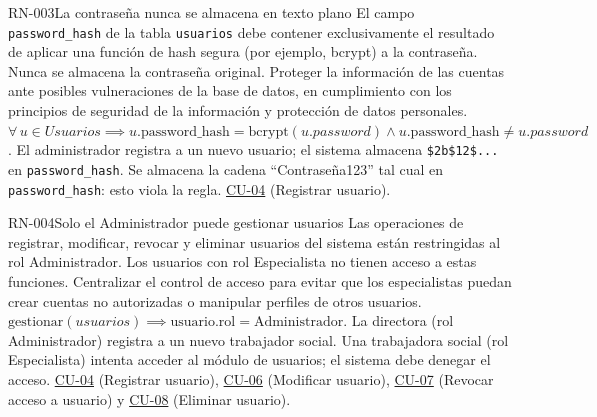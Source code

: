 \begin{BussinesRule}[%
	\brClassification{\btDerivation}{\bcIntegrity}{\blStrict}%
	]{RN-003}{La contraseña nunca se almacena en texto plano}
	\BRitem[Descripción:] El campo \texttt{password\_hash} de la tabla \texttt{usuarios} debe contener exclusivamente el resultado de aplicar una función de hash segura (por ejemplo, bcrypt) a la contraseña. Nunca se almacena la contraseña original.
	\BRitem[Motivación:] Proteger la información de las cuentas ante posibles vulneraciones de la base de datos, en cumplimiento con los principios de seguridad de la información y protección de datos personales.
	\BRitem[Sentencia:] $\forall \, u \in Usuarios \implies u.\text{password\_hash} = \text{bcrypt}(u.password) \land u.\text{password\_hash} \neq u.password$.
	 El administrador registra a un nuevo usuario; el sistema almacena \texttt{\$2b\$12\$...} en \texttt{password\_hash}.
	 Se almacena la cadena ``Contraseña123'' tal cual en \texttt{password\_hash}: esto viola la regla.
	 \hyperlink{CU-04}{CU-04} (Registrar usuario).
\end{BussinesRule}

\begin{BussinesRule}[%
	\brClassification{\btEnabler}{\bcAutorization}{\blStrict}%
	]{RN-004}{Solo el Administrador puede gestionar usuarios}
	\BRitem[Descripción:] Las operaciones de registrar, modificar, revocar y eliminar usuarios del sistema están restringidas al rol Administrador. Los usuarios con rol Especialista no tienen acceso a estas funciones.
	\BRitem[Motivación:] Centralizar el control de acceso para evitar que los especialistas puedan crear cuentas no autorizadas o manipular perfiles de otros usuarios.
	\BRitem[Sentencia:] $\text{gestionar}(usuarios) \implies \text{usuario.rol} = \text{Administrador}$.
	 La directora (rol Administrador) registra a un nuevo trabajador social.
	 Una trabajadora social (rol Especialista) intenta acceder al módulo de usuarios; el sistema debe denegar el acceso.
	 \hyperlink{CU-04}{CU-04} (Registrar usuario), \hyperlink{CU-06}{CU-06} (Modificar usuario), \hyperlink{CU-07}{CU-07} (Revocar acceso a usuario) y \hyperlink{CU-08}{CU-08} (Eliminar usuario).
\end{BussinesRule}

